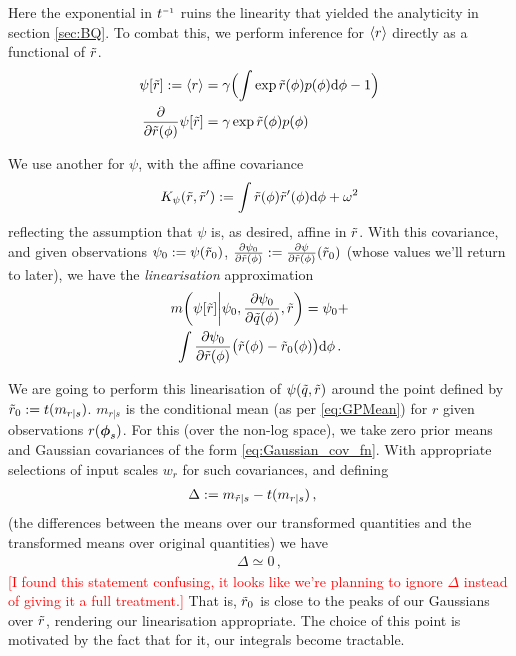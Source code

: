 \documentclass{article}
\begin{document}
Here the exponential in $t\inv$ ruins the linearity that yielded the analyticity in section \ref{sec:BQ}. To combat this, we perform inference for $\inty{r}$ directly as a functional of $\tr$.
%
\begin{align*}
 \psi[\tr] \deq \inty{r} & = \gamma\Bigl(\int  \exp \tr(\phi) p(\phi) \ud \phi-1\Bigr)\\
\pderiv{}{\tr(\phi)}\psi[\tr] & = \gamma \exp \tr(\phi) p(\phi)
\end{align*}

We use another \gpb for $\psi$, with the affine covariance
\begin{equation*}
 K_\psi(\tr,\tr')
\deq
\int\tr(\phi) \tr'(\phi) \ud \phi
+ \omega^2
\end{equation*}
reflecting the assumption that $\psi$ is, as desired, affine in $\tr$. With this covariance, and given observations
$\psi_0 \deq \psi(\tr_0)$, $\pderiv{\psi_0}{\tr(\phi)} \deq \pderiv{\psi}{\tr(\phi)}(\tr_0)$ (whose values we'll return to later), we have the \emph{linearisation} approximation
\begin{multline}\label{eq:linearisation}
\novmean{\psi[\tr]}{\psi_0,\pderiv{\psi_0}{\tq(\phi)}, \tr} 
= \psi_0+\\
\int \pderiv{\psi_0}{\tr(\phi)}\bigl(\tr(\phi)-\tr_0(\phi)\bigr)\ud\phi\,.
\end{multline}

We are going to perform this linearisation of $\psi(\tq,\tr)$ around the point defined by $\tr_0 \deq t(m_{r|s})$. $m_{r|s}$ is the \gpb conditional mean (as per \eqref{eq:GPMean}) for $r$ given observations $r(\vph_s)$. For this \gpb (over the non-log space), we take zero prior means and Gaussian
covariances of the form \eqref{eq:Gaussian_cov_fn}. With appropriate selections of input scales $w_r$ for such covariances, and defining
\begin{align*}
\Delta & \deq m_{\tilde{r}|s} - t(m_{r|s})\,,
\end{align*}
(the differences between the \gpb means over our transformed quantities and the transformed \gpb means over original quantities) we have
\begin{align}\label{eq:mt_sim_tm}
\Delta \simeq 0\,,
\end{align}
\textcolor{red}{[I found this statement confusing, it looks like we're planning to ignore $\Delta$ instead of giving it a full treatment.]}
That is, $\tr_0$ is close to the peaks of our Gaussians over $\tr$, rendering our linearisation appropriate. The choice of this point is motivated by the fact that for it, our integrals become tractable.
\end{document}

